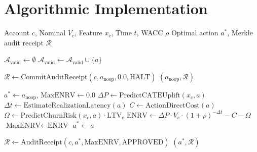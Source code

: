 \documentclass[10pt, twocolumn, a4paper]{article}
\begin{document}
\section{Algorithmic Implementation}

\begin{algorithm}[t]
\caption{CATE-Discounted Multi-Funnel Recovery Optimizer}
\label{alg:optimizer}
\begin{algorithmic}[1]
\Require Account $c$, Nominal $V_c$, Feature $x_c$, Time $t$, WACC $\rho$
\Ensure Optimal action $a^*$, Merkle audit receipt $\mathcal{R}$

\State $\mathcal{A}_{\text{valid}} \gets \emptyset$
        \State $\mathcal{A}_{\text{valid}} \gets \mathcal{A}_{\text{valid}} \cup \{a\}$
    \EndIf
\EndFor

    \State $\mathcal{R} \gets \text{CommitAuditReceipt}(c, a_{\text{noop}}, 0.0, \text{HALT})$
    \Return $(a_{\text{noop}}, \mathcal{R})$
\EndIf

\State $a^* \gets a_{\text{noop}}$, $\text{MaxENRV} \gets 0.0$
    \State $\Delta P \gets \text{PredictCATEUplift}(x_c, a)$
    \State $\Delta t \gets \text{EstimateRealizationLatency}(a)$
    \State $C \gets \text{ActionDirectCost}(a)$
    \State $\Omega \gets \text{PredictChurnRisk}(x_c, a) \cdot \text{LTV}_c$
    \State $\text{ENRV} \gets \Delta P \cdot V_c \cdot (1 + \rho)^{-\Delta t} - C - \Omega$
        \State $\text{MaxENRV} \gets \text{ENRV}$
        \State $a^* \gets a$
    \EndIf
\EndFor

\State $\mathcal{R} \gets \text{AuditReceipt}(c, a^*, \text{MaxENRV}, \text{APPROVED})$
\Return $(a^*, \mathcal{R})$
\end{algorithmic}
\end{algorithm}
\end{document}
